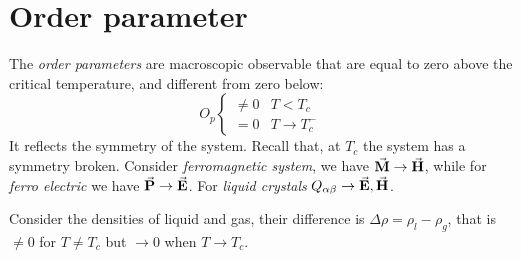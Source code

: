 \documentclass[../main/main.tex]{subfiles}
\begin{document}
\section{Order parameter}
The \emph{order parameters} are macroscopic observable that are equal to zero above the critical temperature, and different from zero below:
\begin{equation}
O_p
  \begin{cases}
  \neq 0 & T<T_c \\
  = 0 & T \rightarrow T_c^-
  \end{cases}
\label{eq:}
\end{equation}
It reflects the symmetry of the system. Recall that, at \( T_c \) the system has a symmetry broken. Consider \emph{ferromagnetic system}, we have \( \va{M} \rightarrow \va{H}   \), while for \emph{ferro electric} we have \( \va{P} \rightarrow \va{E}   \). For \emph{liquid crystals} \( Q_{\alpha \beta } \rightarrow \va{E},\va{H}   \).

Consider the densities of liquid and gas, their difference is \( \Delta \rho = \rho _{l} - \rho _{g} \), that is \( \neq 0 \) for \( T \neq T_c \) but \( \rightarrow 0 \) when \( T \rightarrow T_c \).
\end{document}
